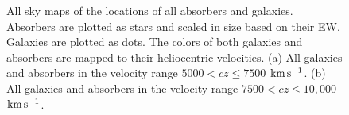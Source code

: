 \documentclass[twocolumn,tighten]{aastex62}
\newcommand{\kms}{$\rm km\, s^{-1}$}
\begin{document}
\begin{figure}[ht!]
\centering
  \label{allsky_7500}
  \label{allsky_10000}
  \caption{\small{All sky maps of the locations of all absorbers and galaxies. Absorbers are plotted as stars and scaled in size based on their EW. Galaxies are plotted as dots. The colors of both galaxies and absorbers are mapped to their heliocentric velocities. (a) All galaxies and absorbers in the velocity range $5000 < cz \leq 7500$ \kms. (b) All galaxies and absorbers in the velocity range $7500 < cz \leq 10,000$ \kms.}}
\vspace{0pt}
\label{allsky_7500-10000}
\end{figure}
\clearpage



\end{document}
